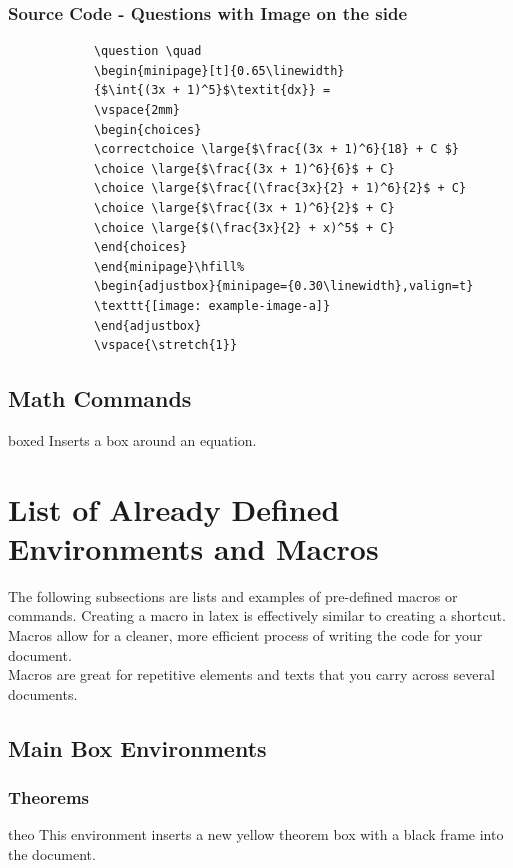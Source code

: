 \documentclass[12pt,hidelinks]{article}
\begin{document}
		\subsubsection{Source Code - Questions with Image on the side}
			\begin{verbatim}		
			\question \quad 
			\begin{minipage}[t]{0.65\linewidth}
			{$\int{(3x + 1)^5}$\textit{dx}} =
			\vspace{2mm}
			\begin{choices}
			\correctchoice \large{$\frac{(3x + 1)^6}{18} + C $}
			\choice \large{$\frac{(3x + 1)^6}{6}$ + C}
			\choice \large{$\frac{(\frac{3x}{2} + 1)^6}{2}$ + C}
			\choice \large{$\frac{(3x + 1)^6}{2}$ + C}
			\choice \large{$(\frac{3x}{2} + x)^5$ + C} 
			\end{choices}
			\end{minipage}\hfill%
			\begin{adjustbox}{minipage={0.30\linewidth},valign=t}
			\texttt{[image: example-image-a]}
			\end{adjustbox}
			\vspace{\stretch{1}}
			\end{verbatim}
	\subsection{Math Commands}
		\begin{docCommand}{boxed}{}
			Inserts a box around an equation.
		\end{docCommand}
\newpage
\section{List of Already Defined Environments and Macros}	
\vspace{10.5cm}
The following subsections are lists and examples of pre-defined macros or commands. Creating a macro in latex is effectively similar to creating a shortcut. Macros allow for a cleaner, more efficient process of writing the code for your document. \\
Macros are great for repetitive elements and texts that you carry across several documents.
	\subsection{Main Box Environments}
		\subsubsection{Theorems}
			\begin{docEnvironment}{theo}{}
				This environment  inserts a new yellow theorem box with a black frame into the document. 
			\end{docEnvironment}
\end{document}
